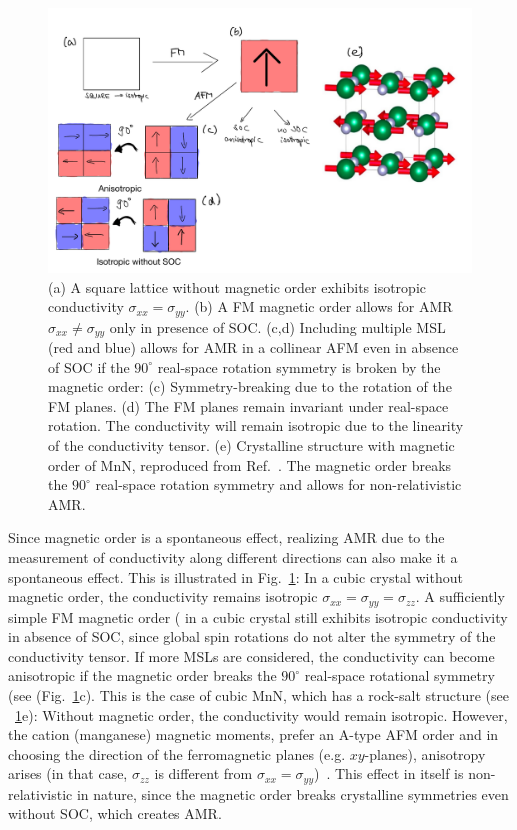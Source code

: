 \documentclass[prb,showpacs,amsmath,amssymb,superscriptaddress,twocolumn,floatfix]{revtex4-1}
\begin{document}
\begin{figure}
	\centering
	\includegraphics[width=1\linewidth]{img/MnN_sketch_v2}
	\caption{(a) A square lattice without magnetic order exhibits isotropic conductivity $\sigma_{xx} = \sigma_{yy}$. (b) A FM magnetic order allows for AMR $\sigma_{xx} \neq \sigma_{yy}$ only in presence of SOC. (c,d) Including multiple MSL {\color{blue} (red and blue) allows for AMR in a collinear AFM even in absence of SOC if the $90^\circ$ real-space rotation symmetry is broken by the magnetic order: (c) Symmetry-breaking due to the rotation of the FM planes. (d) The FM planes remain invariant under real-space rotation. The conductivity will remain isotropic due to the linearity of the conductivity tensor.} (e) Crystalline structure with magnetic order of MnN, reproduced from Ref.~\cite{Dunz:2020}. The magnetic order breaks the $90^\circ$ real-space rotation symmetry and allows for non-relativistic AMR.}
	\label{fig:mnnsketch}
\end{figure}

Since magnetic order is a spontaneous effect, realizing AMR due to the measurement of conductivity along different directions can also make it a spontaneous effect. This is illustrated in Fig.~\ref{fig:mnnsketch}: In a cubic crystal without magnetic order, the conductivity remains isotropic $\sigma_{xx}=\sigma_{yy}=\sigma_{zz}$. A sufficiently simple FM magnetic order ( in a cubic crystal still exhibits isotropic conductivity in absence of SOC, since global spin rotations do not alter the symmetry of the conductivity tensor. If more MSLs are considered, the conductivity can become anisotropic if the magnetic order breaks the $90^\circ$ real-space rotational symmetry (see (Fig.~\ref{fig:mnnsketch}c). This is the case of cubic MnN, which has a rock-salt structure (see ~\ref{fig:mnnsketch}e): Without magnetic order, the conductivity would remain isotropic. However, the cation (manganese) magnetic moments, prefer an A-type AFM order and in choosing
the direction of the ferromagnetic planes (e.g. $xy$-planes),
anisotropy arises (in that case, $\sigma_{zz}$ is different from
$\sigma_{xx}=\sigma_{yy}$)~\cite{Granville:2005}. This effect in itself is non-relativistic in nature, since the magnetic order breaks crystalline symmetries even without SOC, which creates AMR. \\
\end{document}
